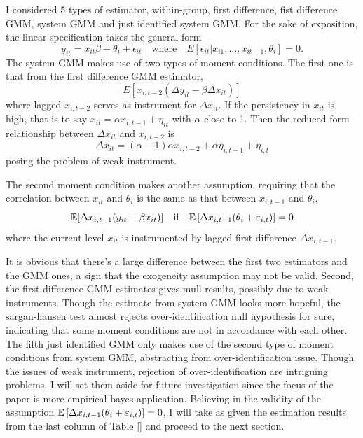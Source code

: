 \documentclass[12pt]{article}
\begin{document}
I considered 5 types of estimator, within-group, first difference, fist
difference GMM, system GMM and just identified system GMM. For the sake of
exposition, the linear specification takes the general form \[
    y_{it} = x_{it} \beta +\theta_i + \epsilon_{it}\quad \text{where} \quad E[\epsilon_{it}|x_{i1},\ldots, x_{it-1},\theta_i]=0.
\]
The system GMM makes use of two types of moment conditions. The first one is
that from the first difference GMM estimator,
\[E[x_{i,t-2}(\Delta y_{it}-\beta\Delta x_{it})]\]
where lagged $x_{i,t-2}$ serves as instrument for $\Delta x_{it}$. If the
persistency in $x_{it}$ is high, that is to say $x_{it}=\alpha
    x_{i,t-1}+\eta_{it}$ with $\alpha$ close to 1. Then the reduced form
relationship between $\Delta x_{it}$ and $x_{i,t-2}$ is
\[\Delta x_{it} = (\alpha-1)\alpha x_{i,t-2}+\alpha \eta_{i,t-1}+\eta_{i,t}\]
posing the problem of weak instrument.

The second moment condition makes another assumption, requiring that the
correlation between $x_{it}$ and $\theta_i$ is the same as that between
$x_{i,t-1}$ and $\theta_i$,
\begin{equation*}
    \mathbb{E}[\Delta x_{i,t-1}(y_{it}-\beta x_{it})] \quad \text{if}\quad \mathbb{E}\left[\Delta x_{i,t-1}(\theta_i+\varepsilon_{i,t})\right]=0
\end{equation*} where the current level $x_{it}$ is instrumented by lagged first difference $\Delta x_{i,t-1}$.

It is obvious that there's a large difference between the first two estimators
and the GMM ones, a sign that the exogeneity assumption may not be valid.
Second, the first difference GMM estimates gives mull results, possibly due to
weak instruments. Though the estimate from system GMM looks more hopeful, the
sargan-hansen test almost rejects over-identification null hypothesis for sure,
indicating that some moment conditions are not in accordance with each other.
The fifth just identified GMM only makes use of the second type of moment
conditions from system GMM, abstracting from over-identification issue. Though
the issues of weak instrument, rejection of over-identification are intriguing
problems, I will set them aside for future investigation since the focus of the
paper is more empirical bayes application. Believing in the validity of the
assumption $\mathbb{E}\left[\Delta x_{i,t-1}(\theta_i+\varepsilon_{i,t})\right]=0$, I will
take as given the estimation results from the last column of Table \ref{} and
proceed to the next section.

\begin{table}
    
    \label{tab:reg_wg_fd_gmm}
\end{table}
\end{document}
